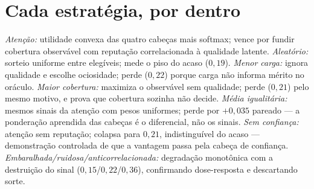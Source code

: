 \section{Cada estratégia, por dentro}
\textit{Atenção:} utilidade convexa das quatro cabeças mais softmax; vence por fundir cobertura observável com reputação correlacionada à qualidade latente. \textit{Aleatório:} sorteio uniforme entre elegíveis; mede o piso do acaso ($0{,}19$). \textit{Menor carga:} ignora qualidade e escolhe ociosidade; perde ($0{,}22$) porque carga não informa mérito no oráculo. \textit{Maior cobertura:} maximiza o observável sem qualidade; perde ($0{,}21$) pelo mesmo motivo, e prova que cobertura sozinha não decide. \textit{Média igualitária:} mesmos sinais da atenção com pesos uniformes; perde por $+0{,}035$ pareado --- a ponderação aprendida das cabeças é o diferencial, não os sinais. \textit{Sem confiança:} atenção sem reputação; colapsa para $0{,}21$, indistinguível do acaso --- demonstração controlada de que a vantagem passa pela cabeça de confiança. \textit{Embaralhada/ruidosa/anticorrelacionada:} degradação monotônica com a destruição do sinal ($0{,}15$/$0{,}22$/$0{,}36$), confirmando dose-resposta e descartando sorte.
